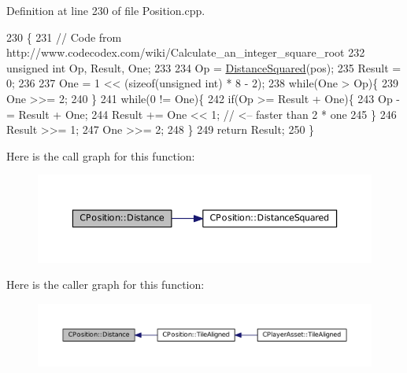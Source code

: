 Definition at line 230 of file Position.\+cpp.


\begin{DoxyCode}
230                                            \{
231     \textcolor{comment}{// Code from http://www.codecodex.com/wiki/Calculate\_an\_integer\_square\_root}
232     \textcolor{keywordtype}{unsigned} \textcolor{keywordtype}{int} Op, Result, One;
233     
234     Op = \hyperlink{classCPosition_acd96d507f44c0fdf13036ebc1a09e59c}{DistanceSquared}(pos);
235     Result = 0;
236     
237     One = 1 << (\textcolor{keyword}{sizeof}(\textcolor{keywordtype}{unsigned} int) * 8 - 2);
238     \textcolor{keywordflow}{while}(One > Op)\{
239         One >>= 2;
240     \}
241     \textcolor{keywordflow}{while}(0 != One)\{
242         \textcolor{keywordflow}{if}(Op >= Result + One)\{
243             Op -= Result + One;  
244             Result += One << 1;  \textcolor{comment}{// <-- faster than 2 * one  }
245         \}
246         Result >>= 1;
247         One >>= 2;
248     \}
249     \textcolor{keywordflow}{return} Result;    
250 \}
\end{DoxyCode}
Here is the call graph for this function\+:\nopagebreak
\begin{figure}[H]
\begin{center}
\leavevmode
\includegraphics[width=350pt]{classCPosition_a9edc6690c78a54ea08b137df83c22e91_cgraph}
\end{center}
\end{figure}
Here is the caller graph for this function\+:\nopagebreak
\begin{figure}[H]
\begin{center}
\leavevmode
\includegraphics[width=350pt]{classCPosition_a9edc6690c78a54ea08b137df83c22e91_icgraph}
\end{center}
\end{figure}
\hypertarget{classCPosition_acd96d507f44c0fdf13036ebc1a09e59c}{}\label{classCPosition_acd96d507f44c0fdf13036ebc1a09e59c} 
